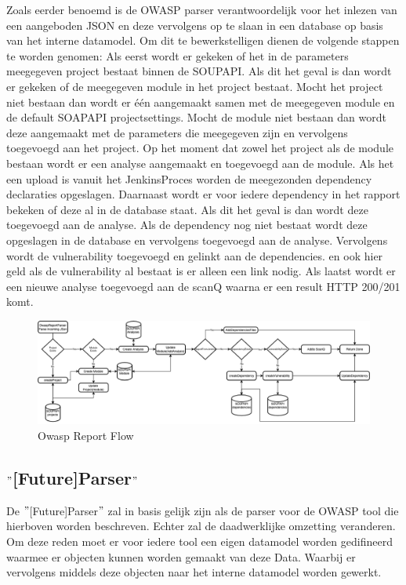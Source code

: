 Zoals eerder benoemd is de OWASP parser verantwoordelijk voor het inlezen van een aangeboden JSON en deze vervolgens op te slaan in een database op basis van het interne datamodel. Om dit te bewerkstelligen dienen de volgende stappen te worden genomen:
Als eerst wordt er gekeken of het in de parameters meegegeven project bestaat binnen de SOUPAPI. Als dit het geval is dan wordt er gekeken of de meegegeven module in het project bestaat. Mocht het project niet bestaan dan wordt er één aangemaakt samen met de meegegeven module en de default SOAPAPI projectsettings. Mocht de module niet bestaan dan wordt deze aangemaakt met de parameters die meegegeven zijn en vervolgens toegevoegd aan het project.
Op het moment dat zowel het project als de module bestaan wordt er een analyse aangemaakt en toegevoegd aan de
module. Als het een upload is vanuit het JenkinsProces worden de meegezonden dependency declaraties opgeslagen. Daarnaast wordt er voor iedere dependency in het rapport bekeken of deze al in de database staat. Als dit het geval is dan wordt deze toegevoegd aan de analyse. Als de dependency nog niet bestaat wordt deze opgeslagen in de database en vervolgens toegevoegd aan de analyse. Vervolgens wordt de vulnerability toegevoegd en gelinkt aan de dependencies. en ook hier geld als de vulnerability al bestaat is er alleen een link nodig.
Als laatst wordt er een nieuwe analyse toegevoegd aan de scanQ waarna er een result HTTP 200/201 komt.
\begin{figure}[H]
    \myfloatalign
    \includegraphics[width=15cm]{gfx/SOUPAPI-ReportParseFlow}
    \caption{Owasp Report Flow}
    \label{fig:OwaspReportFlow}
\end{figure}


\subsection{$"$[Future]Parser$"$}\label{subsec:$"$[future]parser$"$}
De $"$[Future]Parser$"$ zal in basis gelijk zijn als de parser voor de OWASP tool die hierboven worden beschreven. Echter zal de daadwerklijke omzetting veranderen. Om deze reden moet er voor iedere tool een eigen datamodel worden gedifineerd waarmee er objecten kunnen worden gemaakt van deze Data. Waarbij er vervolgens middels deze objecten naar het interne datamodel worden gewerkt.

